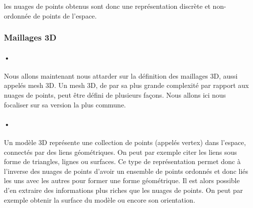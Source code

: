 \begin{figure}[h]
    \hfill
    \hfill
    \caption{}
    \label{fig:figure1}
\end{figure}
\FloatBarrier

les nuages de points obtenus sont donc une représentation discrète et non-ordonnée de points de l'espace.

\FloatBarrier
\subsubsection{Maillages 3D}
\paragraph{•} Nous allons maintenant nous attarder sur la définition des maillages 3D, aussi appelés mesh 3D. Un mesh 3D, de par sa plus grande complexité par rapport aux nuages de points, peut être défini de plusieurs façons. Nous allons ici nous focaliser sur sa version la plus commune.
\paragraph{•} Un modèle 3D représente une collection de points (appelés vertex) dans l'espace, connectés par des liens géométriques. On peut par exemple citer les liens sous forme de triangles, lignes ou surfaces.
Ce type de représentation permet donc à l'inverse des nuages de points d'avoir un ensemble de points ordonnés et donc liés les uns avec les autres pour former une forme géométrique. Il est alors possible d'en extraire des informations plus riches que les nuages de points. On peut par exemple obtenir la surface du modèle ou encore son orientation.



